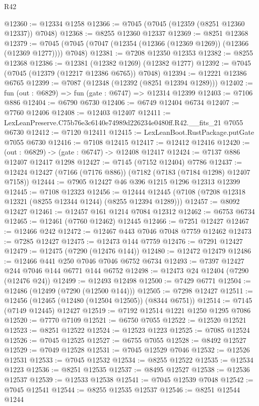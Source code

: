 \begin{lexlean}{R42}
\begin{coremodule}
{@12360 := @12334 @1258
@12366 := @7045 (@7045 (@12359 (@8251 @12360 @12337)) @7048)
@12368 := @8255 @12360 @12337
@12369 := @8251 @12368
@12379 := @7045 (@7045 (@7047 (@12354 (@12366 (@12369 @1269)) (@12366 (@12369 @1277)))) @7048)
@12381 := @7208 @12350 @12353
@12382 := @8255 @12368
@12386 := @12381 (@12382 @1269) (@12382 @1277)
@12392 := @7045 (@7045 (@12379 (@12217 @12386 @6765)) @7048)
@12394 := @12221 @12386 @6765
@12399 := @7087 (@12348 (@12392 (@8251 @12394 @1289)))
@12402 := fun (out : @6829) => fun (gate : @6747) => @12314 @12399
@12403 := @7106 @886
@12404 := @6790 @6730
@12406 := @6749 @12404 @6734
@12407 := @7760 @12406
@12408 := @12403 @12407
@12411 := LexLeanPreserve.C75b76e3c6140e74989d226234e0480ff.R42.__fits_21 @7055 @6730
@12412 := @7120 @12411
@12415 := LexLeanBoot.RustPackage.putGate @7055 @6730
@12416 := @7108 @12415
@12417 := @12412 @12416
@12420 := (out : @6829) -> (gate : @6747) -> @12408 @12417
@12424 := @7137 @886 @12407 @12417 @1298
@12427 := @7145 (@7152 @12404) @7786
@12437 := @12424 @12427 (@7166 (@7176 @886)) (@7182 (@7183 (@7184 @1298) @12407 @7158))
@12444 := @7905 @12427 @46 @396 @1215 @1296 @12313 @12399
@12445 := @7108 @12323
@12456 := @12444 @12445 (@7108 (@7208 @12318 @12321 (@8255 @12344 @1244) (@8255 @12394 @1289)))
@12457 := @8092 @12427
@12461 := @12457 @161 @1214 @7084 @12312
@12462 := @6753 @6734
@12465 := @12461 (@7760 @12462) @12445
@12466 := @7251 @12427
@12467 := @12466 @242
@12472 := @12467 @443 @7046 @7048 @7759 @12462
@12473 := @7285 @12427
@12475 := @12473 @144 @7759
@12476 := @7291 @12427
@12479 := @12475 (@7290 (@12476 @144))
@12480 := @12472 @12479
@12486 := @12466 @441 @250 @7046 @7046 @6752 @6734
@12493 := @7397 @12427 @244 @7046 @144 @6771 @144 @6752
@12498 := @12473 @24 @12404 (@7290 (@12476 @24))
@12499 := @12493 @12498
@12500 := @7429 @6771
@12504 := @12486 (@12499 (@7290 (@12500 @144)))
@12505 := @7298 @12427
@12511 := @12456 (@12465 (@12480 (@12504 @12505)) (@8344 @6751))
@12514 := @7145 (@7149 @12445) @12427
@12519 := @7192 @12514 @1221 @1250 @1295 @7086
@12520 := @7770 @7109
@12521 := @6750 @7055
@12522 := @12520 @12521
@12523 := @8251 @12522
@12524 := @12523 @1223
@12525 := @7085 @12524
@12526 := @7045 @12525
@12527 := @6755 @7055
@12528 := @8492 @12527
@12529 := @7049 @12528
@12531 := @7045 @12529 @7046
@12532 := @12526 @12531
@12533 := @7045 @12532
@12534 := @8255 @12522
@12535 := @12534 @1223
@12536 := @8251 @12535
@12537 := @8495 @12527
@12538 := @12536 @12537
@12539 := @12533 @12538
@12541 := @7045 @12539 @7048
@12542 := @7045 @12541
@12544 := @8255 @12535 @12537
@12546 := @8251 @12544 @1244
}
\end{coremodule}
\end{lexlean}

